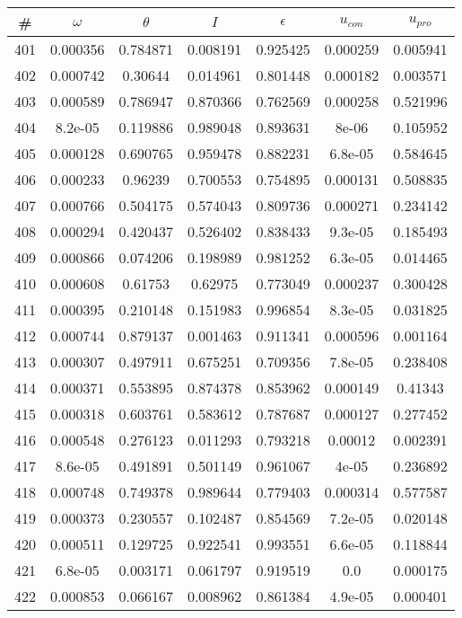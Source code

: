\newpage
\begin{table}
\begin{tabular}{c|c|c|c|c|c|c}
\# & $\omega$ & $\theta$ & $I$ & $\epsilon$ & $u_{con}$ & $u_{pro}$\\
\hline
401 & 0.000356 & 0.784871 & 0.008191 & 0.925425 & 0.000259 & 0.005941\\
402 & 0.000742 & 0.30644 & 0.014961 & 0.801448 & 0.000182 & 0.003571\\
403 & 0.000589 & 0.786947 & 0.870366 & 0.762569 & 0.000258 & 0.521996\\
404 & 8.2e-05 & 0.119886 & 0.989048 & 0.893631 & 8e-06 & 0.105952\\
405 & 0.000128 & 0.690765 & 0.959478 & 0.882231 & 6.8e-05 & 0.584645\\
406 & 0.000233 & 0.96239 & 0.700553 & 0.754895 & 0.000131 & 0.508835\\
407 & 0.000766 & 0.504175 & 0.574043 & 0.809736 & 0.000271 & 0.234142\\
408 & 0.000294 & 0.420437 & 0.526402 & 0.838433 & 9.3e-05 & 0.185493\\
409 & 0.000866 & 0.074206 & 0.198989 & 0.981252 & 6.3e-05 & 0.014465\\
410 & 0.000608 & 0.61753 & 0.62975 & 0.773049 & 0.000237 & 0.300428\\
411 & 0.000395 & 0.210148 & 0.151983 & 0.996854 & 8.3e-05 & 0.031825\\
412 & 0.000744 & 0.879137 & 0.001463 & 0.911341 & 0.000596 & 0.001164\\
413 & 0.000307 & 0.497911 & 0.675251 & 0.709356 & 7.8e-05 & 0.238408\\
414 & 0.000371 & 0.553895 & 0.874378 & 0.853962 & 0.000149 & 0.41343\\
415 & 0.000318 & 0.603761 & 0.583612 & 0.787687 & 0.000127 & 0.277452\\
416 & 0.000548 & 0.276123 & 0.011293 & 0.793218 & 0.00012 & 0.002391\\
417 & 8.6e-05 & 0.491891 & 0.501149 & 0.961067 & 4e-05 & 0.236892\\
418 & 0.000748 & 0.749378 & 0.989644 & 0.779403 & 0.000314 & 0.577587\\
419 & 0.000373 & 0.230557 & 0.102487 & 0.854569 & 7.2e-05 & 0.020148\\
420 & 0.000511 & 0.129725 & 0.922541 & 0.993551 & 6.6e-05 & 0.118844\\
421 & 6.8e-05 & 0.003171 & 0.061797 & 0.919519 & 0.0 & 0.000175\\
422 & 0.000853 & 0.066167 & 0.008962 & 0.861384 & 4.9e-05 & 0.000401\\

\end{tabular}
\end{table}
